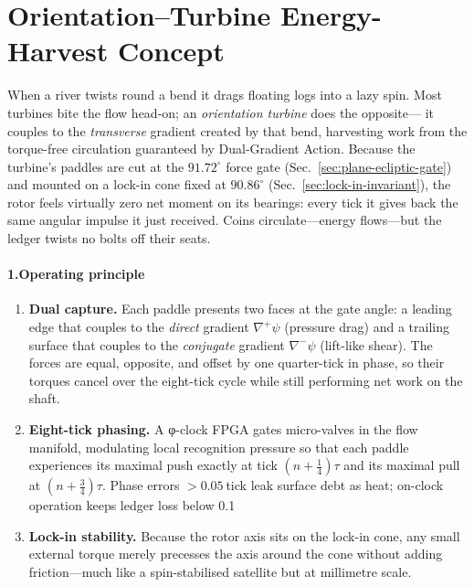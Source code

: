 \documentclass[11pt,oneside]{book}
\begin{document}
\section{Orientation–Turbine Energy-Harvest Concept}
\label{sec:orientation-turbine}

When a river twists round a bend it drags floating logs into a lazy spin.  
Most turbines bite the flow head-on; an \emph{orientation turbine} does the opposite—  
it couples to the \emph{transverse} gradient created by that bend, harvesting work from the torque-free circulation guaranteed by Dual-Gradient Action.  
Because the turbine’s paddles are cut at the $91.72^{\circ}$ force gate
(Sec.~\ref{sec:plane-ecliptic-gate}) and mounted on a lock-in cone
fixed at $90.86^{\circ}$ (Sec.~\ref{sec:lock-in-invariant}), the rotor
feels virtually zero net moment on its bearings: every tick it gives
back the same angular impulse it just received.  
Coins circulate—energy flows—but the ledger twists no bolts off their seats.

\paragraph*{1.\;Operating principle}

\begin{enumerate}
\item \textbf{Dual capture.}  
      Each paddle presents two faces at the gate angle:  
      a leading edge that couples to the \emph{direct} gradient
      $\nabla^{\!+}\psi$ (pressure drag) and a trailing surface that
      couples to the \emph{conjugate} gradient $\nabla^{\!-}\psi$
      (lift-like shear).  The forces are equal, opposite, and offset by
      one quarter-tick in phase, so their torques cancel over the
      eight-tick cycle while still performing net work on the shaft.

\item \textbf{Eight-tick phasing.}  
      A φ-clock FPGA gates micro-valves in the flow manifold, modulating
      local recognition pressure so that each paddle experiences its
      maximal push exactly at tick $(n+\tfrac14)\tau$ and its maximal
      pull at $(n+\tfrac34)\tau$.  Phase errors $>\!0.05$ tick leak
      surface debt as heat; on-clock operation keeps ledger loss below
      0.1 %

\item \textbf{Lock-in stability.}  
      Because the rotor axis sits on the lock-in cone, any small
      external torque merely precesses the axis around the cone without
      adding friction—much like a spin-stabilised satellite but at
      millimetre scale.
\end{enumerate}
\end{document}
